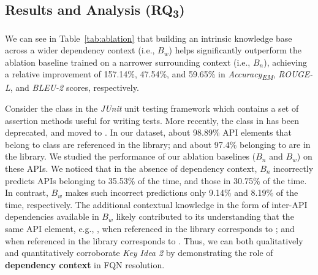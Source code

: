 \subsection*{Results and Analysis (RQ\textsubscript{3})}
\label{sec:rq2}



We can see in Table~\ref{tab:ablation} that building an intrinsic knowledge base across a wider dependency context (i.e., $B_w$) helps \tool significantly outperform the ablation baseline trained on a narrower surrounding context (i.e., $B_n$), achieving a relative improvement of 157.14\%, 47.54\%, and 59.65\% in \textit{Accuracy\textsubscript{EM}}, \textit{ROUGE-L}, and \textit{BLEU-2} scores, respectively. 

Consider the  class in the \textit{JUnit} unit testing framework which contains a set of assertion methods useful for writing tests. More recently, the  class in  has been deprecated, and moved to . In our dataset, about 98.89\% API elements that belong to  class are referenced in the  library; and about 97.4\% belonging to  are in the  library. We studied the performance of our ablation baselines ($B_n$ and $B_w$) on these APIs. We noticed that in the absence of dependency context, $B_n$ incorrectly predicts APIs belonging to  35.53\% of the time, and those in  30.75\% of the time. In contrast, $B_w$ makes such incorrect predictions only 9.14\% and 8.19\% of the time, respectively. The additional contextual knowledge in the form of inter-API dependencies available in $B_w$ likely contributed to its understanding that the same API element, e.g., , when referenced in the  library corresponds to ; and when referenced in the  library corresponds to . Thus, we can both qualitatively and quantitatively corroborate \textit{Key Idea 2} by demonstrating the role of {\bf dependency context} in FQN resolution.






